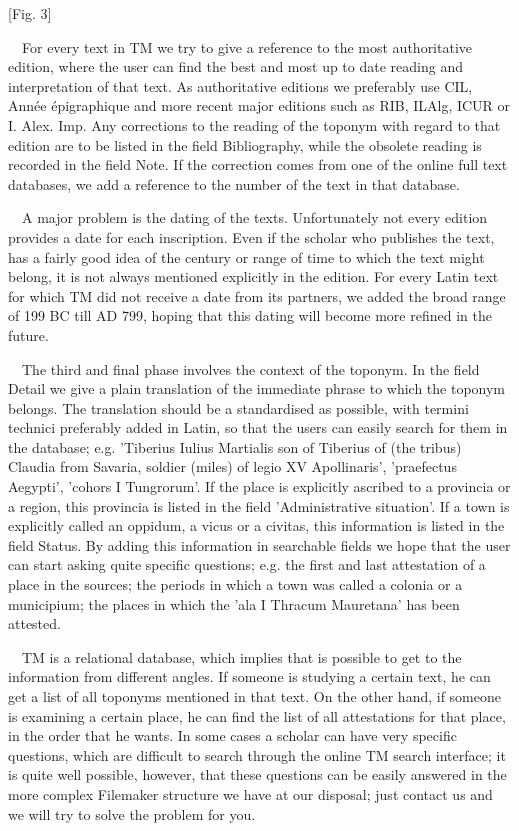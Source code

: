 \documentclass[amsthm,ebook]{saparticle}
\begin{document}
[Fig. 3]

\ \ For every text in TM we try to give a reference to the most authoritative edition, where the user can find the best
and most up to date reading and interpretation of that text. As authoritative editions we preferably use CIL, Année
épigraphique and more recent major editions such as RIB, ILAlg, ICUR or I. Alex. Imp. Any corrections to the reading of
the toponym with regard to that edition are to be listed in the field Bibliography, while the obsolete reading is
recorded in the field Note. If the correction comes from one of the online full text databases, we add a reference to
the number of the text in that database.

\ \ A major problem is the dating of the texts. Unfortunately not every edition provides a date for each inscription.
Even if the scholar who publishes the text, has a fairly good idea of the century or range of time to which the text
might belong, it is not always mentioned explicitly in the edition. For every Latin text for which TM did not receive a
date from its partners, we added the broad range of 199 BC till AD 799, hoping that this dating will become more
refined in the future.

\ \ The third and final phase involves the context of the toponym. In the field Detail we give a plain translation of
the immediate phrase to which the toponym belongs. The translation should be a standardised as possible, with termini
technici preferably added in Latin, so that the users can easily search for them in the database; e.g. 'Tiberius Iulius
Martialis son of Tiberius of (the tribus) Claudia from Savaria, soldier (miles) of legio XV Apollinaris', 'praefectus
Aegypti', 'cohors I Tungrorum'. If the place is explicitly ascribed to a provincia or a region, this provincia is
listed in the field 'Administrative situation'. If a town is explicitly called an oppidum, a vicus or a civitas, this
information is listed in the field Status. By adding this information in searchable fields we hope that the user can
start asking quite specific questions; e.g. the first and last attestation of a place in the sources; the periods in
which a town was called a colonia or a municipium; the places in which the 'ala I Thracum Mauretana' has been attested.

\ \ TM is a relational database, which implies that is possible to get to the information from different angles. If
someone is studying a certain text, he can get a list of all toponyms mentioned in that text. On the other hand, if
someone is examining a certain place, he can find the list of all attestations for that place, in the order that he
wants. In some cases a scholar can have very specific questions, which are difficult to search through the online TM
search interface; it is quite well possible, however, that these questions can be easily answered in the more complex
Filemaker structure we have at our disposal; just contact us and we will try to solve the problem for you.
\end{document}
